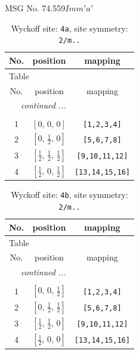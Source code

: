 \documentclass[fleqn,8pt]{jsarticle}
\begin{document}
\setcounter{MaxMatrixCols}{32}

\renewcommand{\tablename}{Table~}
\renewcommand{\figurename}{Figure~}
\begin{center}
\LARGE
MSG No. 74.559\quad$Imm'a'$
\end{center}
\renewcommand{\arraystretch}{1.2}
\begin{longtable}{ccc}
\caption{Wyckoff site: {\tt 4a}, site symmetry: {\tt 2/m..}}
 \\
 \hline \hline
No. & position & mapping \\ \hline \endfirsthead

\multicolumn{2}{l}{\tablename\ \thetable{}} \\
 \hline \hline
No. & position & mapping \\ \hline \endhead

 \hline \hline
\multicolumn{2}{r}{\footnotesize\it continued ...} \\ \endfoot

 \hline \hline
\multicolumn{2}{r}{} \\ \endlastfoot

1 & $\left[ 0,\, 0,\, 0 \right]$ & {\tt [1,2,3,4]} \\ \hline
2 & $\left[ 0,\, \frac{1}{2},\, 0 \right]$ & {\tt [5,6,7,8]} \\ \hline
3 & $\left[ \frac{1}{2},\, \frac{1}{2},\, \frac{1}{2} \right]$ & {\tt [9,10,11,12]} \\ \hline
4 & $\left[ \frac{1}{2},\, 0,\, \frac{1}{2} \right]$ & {\tt [13,14,15,16]} \\
\end{longtable}
\renewcommand{\arraystretch}{1.2}
\begin{longtable}{ccc}
\caption{Wyckoff site: {\tt 4b}, site symmetry: {\tt 2/m..}}
 \\
 \hline \hline
No. & position & mapping \\ \hline \endfirsthead

\multicolumn{2}{l}{\tablename\ \thetable{}} \\
 \hline \hline
No. & position & mapping \\ \hline \endhead

 \hline \hline
\multicolumn{2}{r}{\footnotesize\it continued ...} \\ \endfoot

 \hline \hline
\multicolumn{2}{r}{} \\ \endlastfoot

1 & $\left[ 0,\, 0,\, \frac{1}{2} \right]$ & {\tt [1,2,3,4]} \\ \hline
2 & $\left[ 0,\, \frac{1}{2},\, \frac{1}{2} \right]$ & {\tt [5,6,7,8]} \\ \hline
3 & $\left[ \frac{1}{2},\, \frac{1}{2},\, 0 \right]$ & {\tt [9,10,11,12]} \\ \hline
4 & $\left[ \frac{1}{2},\, 0,\, 0 \right]$ & {\tt [13,14,15,16]} \\
\end{longtable}
\end{document}
